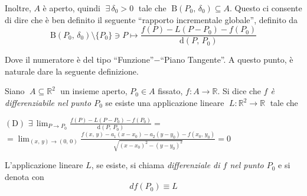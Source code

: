 Inoltre, $A$ è aperto, quindi $\; \exists \, \delta_0 > 0 \;$ tale che $\; \mathrm{B}(P_0,\,\delta_0) \subseteq A$. Questo ci consente di dire che è ben definito il seguente ``rapporto incrementale globale'', definito da
$$
\mathrm{B}(P_0,\,\delta_0) \setminus \lbrace P_0 \rbrace \ni P \longmapsto
\frac{f(P)-L(P-P_0)-f(P_0)}{\mathrm{d}(P,\,P_0)}
$$

Dove il numeratore è del tipo ``Funzione''$-$``Piano Tangente''. A questo punto, è naturale dare la seguente definizione.

\begin{definition}
Siano $\; A \subseteq \mathbb{R}^2 \;$ un insieme aperto, $P_0 \in A$ fissato, $f:A \longrightarrow \mathbb{R}$. Si dice che \emph{$f$ è differenziabile nel punto $P_0$} se esiste una applicazione lineare $\; L: \mathbb{R}^2 \longrightarrow \mathbb{R} \;$ tale che

\begin{center}
$\mathrm{(D)}$
\hfill
$\displaystyle
\exists \, \lim_{P \rightarrow P_0} \frac{f(P)-L(P-P_0)-f(P_0)}{\mathrm{d}(P,\,P_0)} =$
\hfill \null \\
\vskip 16pt
\hfill
$\displaystyle
=\lim_{(x,\,y) \rightarrow (0,\,0)} \frac{f(x,\,y) - a_1(x-x_0) - a_2(y-y_0) - f(x_0,\,y_0)}{\sqrt{(x-x_0)^2 - (y-y_0)^2}} =
0
$
\hfill \null
\end{center}

L'applicazione lineare $L$, se esiste, si chiama \emph{differenziale di $f$ nel punto $P_0$} e si denota con
$$df(P_0) \equiv L$$
\end{definition}

